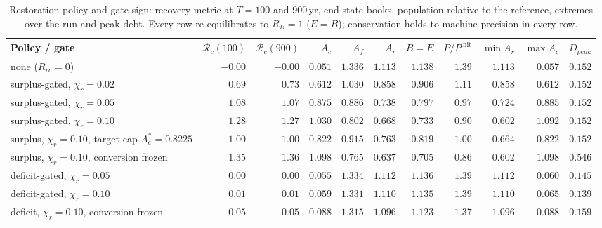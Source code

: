 \documentclass[11pt,a4paper]{article}
\begin{document}
\begin{table}[htbp]
\centering\scriptsize
\setlength{\tabcolsep}{2.5pt}
\caption{Restoration policy and gate sign: recovery metric at $T=100$ and $900$\,yr, end-state books, population relative to the reference, extremes over the run and peak debt. Every row re-equilibrates to $R_B=1$ ($E=B$); conservation holds to machine precision in every row.}
\label{tab:si_gates}
\begin{tabular}{l r r r r r r r r r r}
\toprule
Policy / gate & $\mathcal R_c(100)$ & $\mathcal R_c(900)$ & $A_c$ & $A_f$ & $A_r$ & $B=E$ & $P/P^{\mathrm{init}}$ & $\min A_r$ & $\max A_c$ & $D_{peak}$ \\
\midrule
none ($R_{rc}=0$) & $-0.00$ & $-0.00$ & $0.051$ & $1.336$ & $1.113$ & $1.138$ & $1.39$ & $1.113$ & $0.057$ & $0.152$ \\
surplus-gated, $\chi_r=0.02$ & $0.69$ & $0.73$ & $0.612$ & $1.030$ & $0.858$ & $0.906$ & $1.11$ & $0.858$ & $0.612$ & $0.152$ \\
surplus-gated, $\chi_r=0.05$ & $1.08$ & $1.07$ & $0.875$ & $0.886$ & $0.738$ & $0.797$ & $0.97$ & $0.724$ & $0.885$ & $0.152$ \\
surplus-gated, $\chi_r=0.10$ & $1.28$ & $1.27$ & $1.030$ & $0.802$ & $0.668$ & $0.733$ & $0.90$ & $0.602$ & $1.092$ & $0.152$ \\
surplus, $\chi_r=0.10$, target cap $A_c^*=0.8225$ & $1.00$ & $1.00$ & $0.822$ & $0.915$ & $0.763$ & $0.819$ & $1.00$ & $0.664$ & $0.822$ & $0.152$ \\
surplus, $\chi_r=0.10$, conversion frozen & $1.35$ & $1.36$ & $1.098$ & $0.765$ & $0.637$ & $0.705$ & $0.86$ & $0.602$ & $1.098$ & $0.546$ \\
deficit-gated, $\chi_r=0.05$ & $0.00$ & $0.00$ & $0.055$ & $1.334$ & $1.112$ & $1.136$ & $1.39$ & $1.112$ & $0.060$ & $0.145$ \\
deficit-gated, $\chi_r=0.10$ & $0.01$ & $0.01$ & $0.059$ & $1.331$ & $1.110$ & $1.135$ & $1.39$ & $1.110$ & $0.065$ & $0.139$ \\
deficit, $\chi_r=0.10$, conversion frozen & $0.05$ & $0.05$ & $0.088$ & $1.315$ & $1.096$ & $1.123$ & $1.37$ & $1.096$ & $0.088$ & $0.159$ \\
\bottomrule
\end{tabular}
\end{table}
\end{document}
